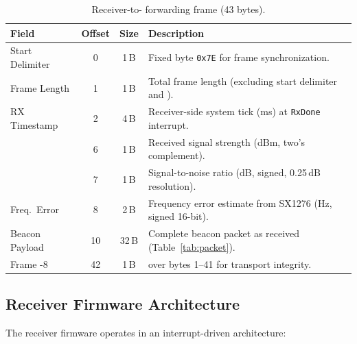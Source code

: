 \documentclass[11pt,letterpaper]{article}
\begin{document}
	\begin{table}[ht!]
		\centering
		\caption{Receiver-to-\FPGA{} forwarding frame (43 bytes).}
		\label{tab:rxframe}
		\renewcommand{\arraystretch}{1.3}
		\begin{tabularx}{\textwidth}{l c c X}
			\toprule
			\textbf{Field} & \textbf{Offset} & \textbf{Size} & \textbf{Description} \\
			\midrule
			Start Delimiter & 0 & 1\,B & Fixed byte \texttt{0x7E} for frame synchronization. \\
			Frame Length & 1 & 1\,B & Total frame length (excluding start delimiter and \CRC{}). \\
			RX Timestamp & 2 & 4\,B & Receiver-side system tick (ms) at \texttt{RxDone} interrupt. \\
			\RSSI{} & 6 & 1\,B & Received signal strength (dBm, two's complement). \\
			\SNR{} & 7 & 1\,B & Signal-to-noise ratio (dB, signed, 0.25\,dB resolution). \\
			Freq.\ Error & 8 & 2\,B & Frequency error estimate from SX1276 (Hz, signed 16-bit). \\
			Beacon Payload & 10 & 32\,B & Complete beacon packet as received (Table~\ref{tab:packet}). \\
			Frame \CRC{}-8 & 42 & 1\,B & \CRC{} over bytes 1--41 for transport integrity. \\
			\bottomrule
		\end{tabularx}
	\end{table}
	
	\subsection{Receiver Firmware Architecture}
	
	The receiver firmware operates in an interrupt-driven architecture:
	
\end{document}

